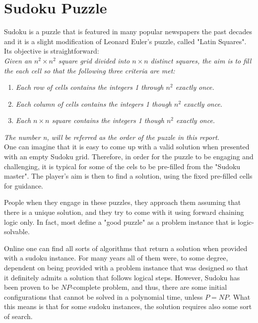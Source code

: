 \documentclass[11pt]{report}
\begin{document}
\section*{Sudoku Puzzle}

Sudoku is a puzzle that is featured in many popular newspapers the past decades and it is a slight modification of Leonard Euler's puzzle, called "Latin Squares". Its objective is straightforward:
\\

\textit{Given an $n^2\times n^2$ square grid divided into $n\times n$ distinct squares, the aim is to fill the each cell so that the following three criteria are met:}
\begin{enumerate}
	\item \textit{Each row of cells contains the integers 1 through $n^2$ exactly once.}
	\item \textit{Each column of cells contains the integers 1 though $n^2$ exactly once.}
	\item \textit{Each $n\times n$ square contains the integers 1 though $n^2$ exactly once.}
\end{enumerate}
\textit{The number n, will be referred as the order of the puzzle in this report.}
\\

One can imagine that it is easy to come up with a valid solution when presented with an empty Sudoku grid. Therefore, in order for the puzzle to be engaging and challenging, it is typical for some of the cels to be pre-filled from the "Sudoku master". The player's aim is then to find a solution, using the fixed pre-filled cells for guidance.

People when they engage in these puzzles, they approach them assuming that there is a unique solution, and they try to come with it using forward chaining logic only. In fact, most define a "good puzzle" as a problem instance that is logic-solvable.

Online one can find all sorts of algorithms that return a solution when provided with a sudoku instance. For many years all of them were, to some degree, dependent on being provided with a problem instance that was designed so that it definitely admits a solution that follows logical steps. However, Sudoku has been proven to be $NP$-complete problem, and thus, there are some initial configurations that cannot be solved in a polynomial time, unless $P=NP$. What this means is that for some sudoku instances, the solution requires also some sort of search.
\end{document}
